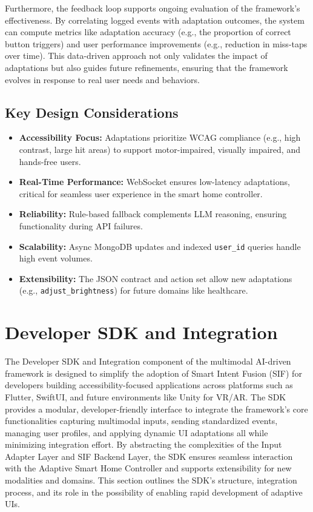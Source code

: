 \documentclass[openany]{book}
\begin{document}
Furthermore, the feedback loop supports ongoing evaluation of the framework’s effectiveness. By correlating logged events with adaptation outcomes, the system can compute metrics like adaptation accuracy (e.g., the proportion of correct button triggers) and user performance improvements (e.g., reduction in miss-taps over time). This data-driven approach not only validates the impact of adaptations but also guides future refinements, ensuring that the framework evolves in response to real user needs and behaviors.
\subsection{Key Design Considerations}
\begin{itemize}
    \item \textbf{Accessibility Focus:} Adaptations prioritize WCAG compliance (e.g., high contrast, large hit areas) to support motor-impaired, visually impaired, and hands-free users.
    \item \textbf{Real-Time Performance:} WebSocket ensures low-latency adaptations, critical for seamless user experience in the smart home controller.
    \item \textbf{Reliability:} Rule-based fallback complements LLM reasoning, ensuring functionality during API failures.
    \item \textbf{Scalability:} Async MongoDB updates and indexed \texttt{user\_id} queries handle high event volumes.
    \item \textbf{Extensibility:} The JSON contract and action set allow new adaptations (e.g., \texttt{adjust\_brightness}) for future domains like healthcare.
\end{itemize}

\section{Developer SDK and Integration}
The Developer SDK and Integration component of the multimodal AI-driven framework is designed to simplify the adoption of Smart Intent Fusion (SIF) for developers building accessibility-focused applications across platforms such as Flutter, SwiftUI, and future environments like Unity for VR/AR. The SDK provides a modular, developer-friendly interface to integrate the framework’s core functionalities capturing multimodal inputs, sending standardized events, managing user profiles, and applying dynamic UI adaptations all while minimizing integration effort. By abstracting the complexities of the Input Adapter Layer and SIF Backend Layer, the SDK ensures seamless interaction with the Adaptive Smart Home Controller and supports extensibility for new modalities and domains. This section outlines the SDK’s structure, integration process, and its role in the possibility of enabling rapid development of adaptive UIs.
\end{document}
